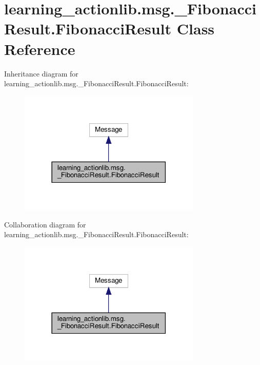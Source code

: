 \hypertarget{classlearning__actionlib_1_1msg_1_1__FibonacciResult_1_1FibonacciResult}{}\section{learning\+\_\+actionlib.\+msg.\+\_\+\+Fibonacci\+Result.\+Fibonacci\+Result Class Reference}
\label{classlearning__actionlib_1_1msg_1_1__FibonacciResult_1_1FibonacciResult}


Inheritance diagram for learning\+\_\+actionlib.\+msg.\+\_\+\+Fibonacci\+Result.\+Fibonacci\+Result\+:
\nopagebreak
\begin{figure}[H]
\begin{center}
\leavevmode
\includegraphics[width=246pt]{classlearning__actionlib_1_1msg_1_1__FibonacciResult_1_1FibonacciResult__inherit__graph}
\end{center}
\end{figure}


Collaboration diagram for learning\+\_\+actionlib.\+msg.\+\_\+\+Fibonacci\+Result.\+Fibonacci\+Result\+:
\nopagebreak
\begin{figure}[H]
\begin{center}
\leavevmode
\includegraphics[width=246pt]{classlearning__actionlib_1_1msg_1_1__FibonacciResult_1_1FibonacciResult__coll__graph}
\end{center}
\end{figure}
